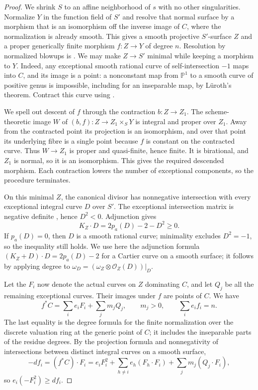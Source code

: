 \begin{proof}
We shrink $S$ to an affine neighborhood of $s$ with no other
singularities. Normalize $Y$ in the function field of $S'$ and
resolve that normal surface by a morphism that is an isomorphism
off the inverse image of $C$, where the normalization is already
smooth. This gives a smooth projective
$S'$-surface $Z$ and a proper generically finite morphism
$f:Z\to Y$ of degree $n$. Resolution by normalized blowups is
\cite[Theorem 54.14.5, Tag 0BGP]{StacksDSurfaceResolution}.
We may make $Z\to S'$ minimal while keeping a morphism to $Y$.
Indeed, any exceptional smooth rational curve of self-intersection
$-1$ maps into $C$, and its image is a point: a nonconstant map
from $\mathbb P^1$ to a smooth curve of positive genus is impossible,
including for an inseparable map, by L\"uroth's theorem.
Contract this curve using
\cite[Lemma 54.16.8, Tag 0C2M]{StacksDSurfaceResolution}.

We spell out descent of $f$ through the contraction $b:Z\to Z_1$.
The scheme-theoretic image $W$ of $(b,f):Z\to Z_1\times_S Y$ is
integral and proper over $Z_1$. Away from the contracted point its
projection is an isomorphism, and over that point its underlying
fibre is a single point because $f$ is constant on the contracted
curve. Thus $W\to Z_1$ is proper and quasi-finite, hence finite.
It is birational, and $Z_1$ is normal, so it is an isomorphism.
This gives the required descended morphism. Each contraction lowers
the number of exceptional components, so the procedure terminates.

On this minimal $Z$, the canonical divisor has nonnegative
intersection with every exceptional integral curve $D$ over $S'$.
The exceptional intersection matrix is negative definite
\cite[Section 10.1, Theorem 10.1]{Kollar2013D}, hence $D^2<0$.
Adjunction gives
\[
                  K_Z\cdot D=2p_a(D)-2-D^2\geq0.
\]
If $p_a(D)=0$, then $D$ is a smooth rational curve; minimality
excludes $D^2=-1$, so the inequality still holds. We use here
the adjunction formula $(K_Z+D)\cdot D=2p_a(D)-2$ for a Cartier
curve on a smooth surface; it follows by applying degree to
$\omega_D=(\omega_Z\otimes\mathcal O_Z(D))|_D$.

Let the $F_i$ now denote the actual curves on $Z$ dominating $C$,
and let $Q_j$ be all the remaining exceptional curves. Their
images under $f$ are points of $C$. We have
\[
             f^*C=\sum_i e_iF_i+\sum_j m_jQ_j,
             \qquad m_j>0,\qquad \sum_i e_if_i=n.
 \tag{D.PG.2}
\]
The last equality is the degree formula for the finite normalization
over the discrete valuation ring at the generic point of $C$;
it includes the inseparable parts of the residue degrees.
By the projection formula and nonnegativity of intersections
between distinct integral curves on a smooth surface,
\[
 -df_i=(f^*C)\cdot F_i
       =e_iF_i^2+\sum_{h\ne i}e_h(F_h\cdot F_i)
                      +\sum_jm_j(Q_j\cdot F_i),
\]
so $e_i(-F_i^2)\geq df_i$.


\end{proof}
